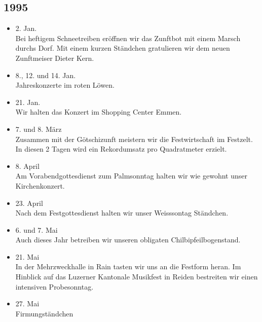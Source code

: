 \subsection{1995}

\begin{history}


    \begin{itemize}

        \item 2. Jan.\\
              Bei heftigem Schneetreiben eröffnen wir das Zunftbot mit einem Marsch
              durchs Dorf. Mit einem kurzen Ständchen gratulieren wir dem neuen
              Zunftmeiser Dieter Kern.

        \item 8., 12. und 14. Jan.\\
              Jahreskonzerte im roten Löwen.

        \item 21. Jan.\\
              Wir halten das Konzert im Shopping Center Emmen.

        \item 7. und 8. März\\
              Zusammen mit der Götschizunft meistern wir die Festwirtschaft im
              Festzelt. In diesen 2 Tagen wird ein Rekordumsatz pro Quadratmeter
              erzielt.

        \item 8. April\\
              Am Vorabendgottesdienst zum Palmsonntag halten wir wie gewohnt unser
              Kirchenkonzert.

        \item 23. April\\
              Nach dem Festgottesdienst halten wir unser Weisssontag Ständchen.

        \item 6. und 7. Mai\\
              Auch dieses Jahr betreiben wir unseren obligaten Chilbipfeilbogenstand.

        \item 21. Mai\\
              In der Mehrzweckhalle in Rain tasten wir uns an die Festform heran. Im
              Hinblick auf das Luzerner Kantonale Musikfest in Reiden bestreiten wir
              einen intensiven Probesonntag.

        \item 27. Mai\\
              Firmungständchen


\end{itemize}
\end{history}
